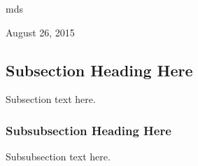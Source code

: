 \documentclass[conference]{IEEEtran}
\begin{document}
\hfill mds
 
\hfill August 26, 2015

\subsection{Subsection Heading Here}
Subsection text here.


\subsubsection{Subsubsection Heading Here}
Subsubsection text here.

%
%



%
%
\end{document}
